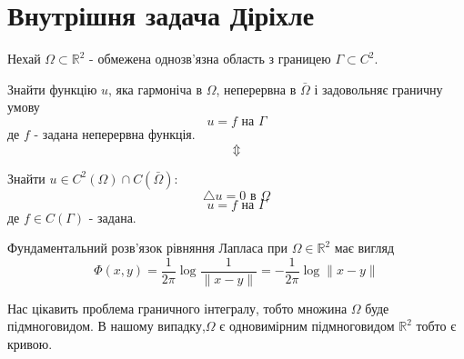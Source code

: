 \documentclass[12pt]{report}
\begin{document}
	\section{Внутрішня задача Діріхле}
	\hspace{0.8cm} Нехай $\Omega\subset\mathbb{R}^2$ - обмежена однозв'язна область з границею $\Gamma\subset C^2$.
	\par Знайти функцію $u$, яка гармоніча в $\Omega$, неперервна в $\bar{\Omega}$ і задовольняє граничну умову $$u=f \text{ на }\Gamma$$
	де $f$ - задана неперервна функція. $$\Updownarrow$$
	\par Знайти $u\in C^2(\Omega)\cap C(\bar{\Omega}):$
	$$\triangle u=0 \text{ в }\Omega$$
	$$u=f\text{ на }\Gamma$$
	де $f\in C(\Gamma)$ - задана.
	\par Фундаментальний розв'язок рівняння Лапласа при $\Omega\in\mathbb{R}^2$ має вигляд $$\Phi(x,y)=\frac{1}{2\pi}\log\frac{1}{\|x-y\|}=-\frac{1}{2\pi}\log\|x-y\|$$
	\par Нас цікавить проблема граничного інтегралу, тобто множина $\Omega$ буде підмноговидом. В нашому випадку,$\Omega$ є одновимірним підмноговидом $\mathbb{R}^2$ тобто є кривою.
	
\end{document}

